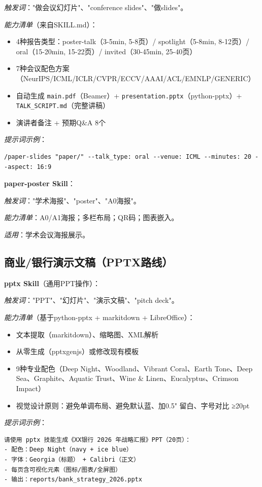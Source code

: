 \textit{触发词}："做会议幻灯片"、"conference slides"、"做slides"。

\textit{能力清单}（来自SKILL.md）：
\begin{itemize}[leftmargin=1em]
  \item 4种报告类型：poster-talk（3-5min, 5-8页）/ spotlight（5-8min, 8-12页）/ oral（15-20min, 15-22页）/ invited（30-45min, 25-40页）
  \item 7种会议配色方案（NeurIPS/ICML/ICLR/CVPR/ECCV/AAAI/ACL/EMNLP/GENERIC）
  \item 自动生成 \texttt{main.pdf}（Beamer）+ \texttt{presentation.pptx}（python-pptx）+ \texttt{TALK\_SCRIPT.md}（完整讲稿）
  \item 演讲者备注 + 预期Q\&A 8个
\end{itemize}

\textit{提示词示例}：
\begin{lstlisting}
/paper-slides "paper/" --talk_type: oral --venue: ICML --minutes: 20 --aspect: 16:9
\end{lstlisting}

\textbf{paper-poster Skill}：

\textit{触发词}："学术海报"、"poster"、"A0海报"。

\textit{能力清单}：A0/A1海报；多栏布局；QR码；图表嵌入。

\textit{适用}：学术会议海报展示。

\subsection{商业/银行演示文稿（PPTX路线）}

\textbf{pptx Skill}（通用PPT操作）：

\textit{触发词}："PPT"、"幻灯片"、"演示文稿"、"pitch deck"。

\textit{能力清单}（基于python-pptx + markitdown + LibreOffice）：
\begin{itemize}[leftmargin=1em]
  \item 文本提取（markitdown）、缩略图、XML解析
  \item 从零生成（pptxgenjs）或修改现有模板
  \item 9种专业配色（Deep Night、Woodland、Vibrant Coral、Earth Tone、Deep Sea、Graphite、Aquatic Trust、Wine \& Linen、Eucalyptus、Crimson Impact）
  \item 视觉设计原则：避免单调布局、避免默认蓝、加0.5" 留白、字号对比 ≥20pt
\end{itemize}

\textit{提示词示例}：
\begin{lstlisting}
请使用 pptx 技能生成《XX银行 2026 年战略汇报》PPT（20页）：
- 配色：Deep Night（navy + ice blue）
- 字体：Georgia（标题） + Calibri（正文）
- 每页含可视化元素（图标/图表/全屏图）
- 输出：reports/bank_strategy_2026.pptx
\end{lstlisting}

